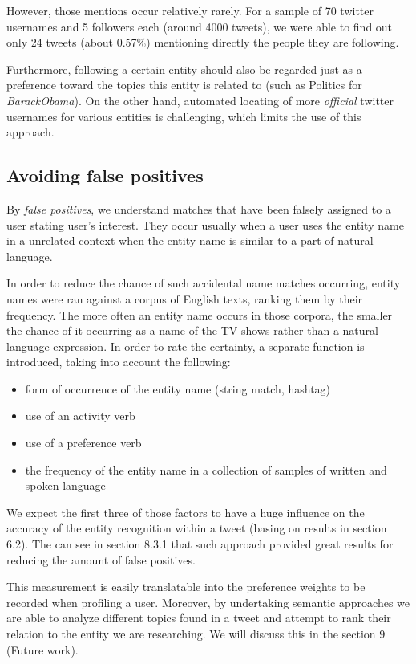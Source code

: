 However, those mentions occur relatively rarely. For a sample of 70 twitter usernames and 5 followers each
(around 4000 tweets), we were able to find out only 24 tweets (about 0.57\%) mentioning directly the people they are following.

Furthermore, following a certain entity should also be regarded just as a preference toward the topics this entity is related to (such as Politics for \textit{BarackObama}). On the other hand, automated locating of more \textit{official} twitter usernames for various entities is challenging, which
limits the use of this approach.

\subsection{Avoiding false positives}
By \textit{false positives}, we understand matches that have been falsely assigned to a user stating user's interest.
They occur usually when a user uses the entity name in a unrelated context when the entity name is similar to a
part of natural language.

In order to reduce the chance of such accidental name matches occurring, entity names were ran against a corpus
of English texts, ranking them by their frequency. The more often an entity name occurs in those corpora, the smaller the chance of it occurring as a name of the TV shows rather than a natural language expression. In order to rate the certainty, a separate function is introduced, taking into account the following:

\begin{itemize}
  \item form of occurrence of the entity name (string match, hashtag)
  \item use of an activity verb
  \item use of a preference verb
  \item the frequency of the entity name in a collection of samples of written and spoken language
\end{itemize}

We expect the first three of those factors to have a huge influence on the accuracy of the entity recognition within a tweet (basing on results in section 6.2). The can see in section 8.3.1 that such approach provided great results for
reducing the amount of false positives.

This measurement is easily translatable into the preference weights to be recorded when profiling a user.
Moreover, by undertaking semantic approaches we are able to analyze different topics found in a tweet and
attempt to rank their relation to the entity we are researching. We will discuss this in the section 9 (Future work).

